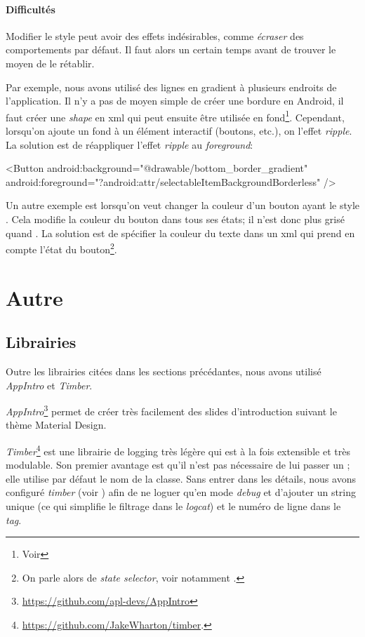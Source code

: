 \paragraph*{Difficultés} Modifier le style peut avoir des effets indésirables, comme \emph{écraser} des comportements par défaut. Il faut alors un certain temps avant de trouver le moyen de le rétablir. 

Par exemple, nous avons utilisé des lignes en gradient à plusieurs endroits de l'application. Il n'y a pas de moyen simple de créer une bordure en Android, il faut créer une \emph{shape} en xml qui peut ensuite être utilisée en fond\footnote{Voir }. Cependant, lorsqu'on ajoute un fond à un élément interactif (boutons, etc.), on  l'effet \emph{ripple}. La solution est de réappliquer l'effet \emph{ripple} au \emph{foreground}:

\begin{xmlcode}
<Button 
    android:background="@drawable/bottom_border_gradient"
    android:foreground="?android:attr/selectableItemBackgroundBorderless" />
\end{xmlcode}

Un autre exemple est lorsqu'on veut changer la couleur d'un bouton ayant le style . Cela modifie la couleur du bouton dans tous ses états; il n'est donc plus grisé quand . La solution est de spécifier la couleur du texte dans un xml qui prend en compte l'état du bouton\footnote{On parle alors de \emph{state selector}, voir notamment .}.

\section{Autre}


\subsection{Librairies}

Outre les librairies citées dans les sections précédantes, nous avons utilisé \emph{AppIntro} et \emph{Timber}.

\emph{AppIntro}\footnote{\url{https://github.com/apl-devs/AppIntro}} permet de créer très facilement des slides d'introduction suivant le thème Material Design. 

\emph{Timber}\footnote{\url{https://github.com/JakeWharton/timber}.} est une librairie de logging très légère qui est à la fois extensible et très modulable. Son premier avantage est qu'il n'est pas nécessaire de lui passer un ; elle utilise par défaut le nom de la classe. Sans entrer dans les détails, nous avons configuré \emph{timber} (voir ) afin de ne loguer qu'en mode \emph{debug} et d'ajouter un string unique (ce qui simplifie le filtrage dans le \emph{logcat}) et le numéro de ligne dans le \emph{tag}. 

